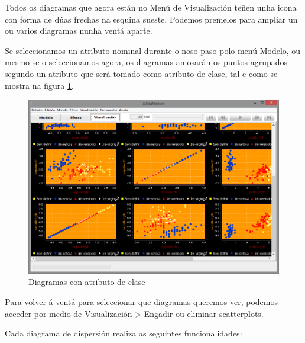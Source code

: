Todos os diagramas que agora están no Menú de Visualización teñen unha icona con forma de dúas frechas na esquina sueste. Podemos premelos para ampliar un ou varios diagramas nunha ventá aparte.

Se seleccionamos un atributo nominal durante o noso paso polo menú Modelo, ou mesmo se o seleccionamos agora, os diagramas amosarán os puntos agrupados segundo un atributo que será tomado como atributo de clase, tal e como se mostra na figura \ref{diagramasNominais}.

\begin{figure}
\centering
\includegraphics[width=\textwidth,height=\textheight,keepaspectratio]{figuras/diagramasNominais}
\caption{Diagramas con atributo de clase}
\label{diagramasNominais}
\end{figure}

Para volver á ventá para seleccionar que diagramas queremos ver, podemos acceder por medio de Visualización \textgreater{} Engadir ou eliminar scatterplots.

Cada diagrama de dispersión realiza as seguintes funcionalidades:

